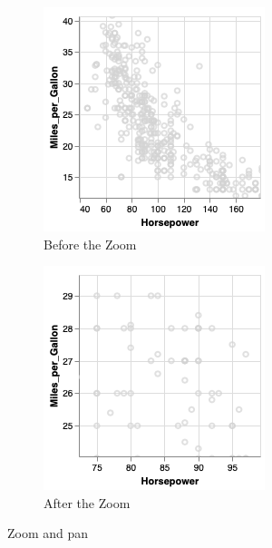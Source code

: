 \begin{figure}[h]
\begin{subfigure}{.5\textwidth}
  \centering
  \captionsetup{justification=centering}
  \includegraphics[width=.8\linewidth]{Report-latex/tex_files/pics/zoom1.png}  
  \caption{Before the Zoom}
  \label{fig:sub-first}
\end{subfigure}
\begin{subfigure}{.5\textwidth}
  \centering
  \captionsetup{justification=centering}
  \includegraphics[width=.8\linewidth]{Report-latex/tex_files/pics/zoom2.png}  
  \caption{After the Zoom}
  \label{fig:sub-second}
\end{subfigure}
\captionsetup{justification=centering}
\caption{Zoom and pan \cite{zoompan} }
\label{fig:zoom\&pan}
\end{figure}

